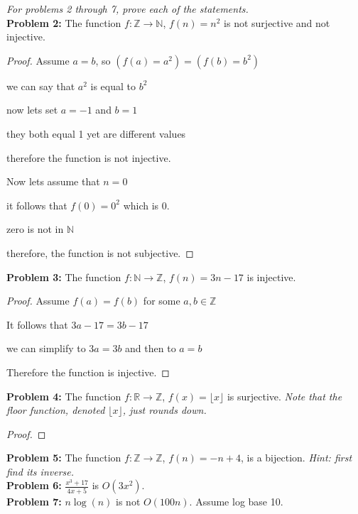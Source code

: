 \documentclass[12pt]{article}
\def\R{\mathbb R} %
\def\Z{\mathbb Z}
\def\N{\mathbb N}
\begin{document}
\textit{For problems 2 through 7, prove each of the statements.} \\ 

{\bf Problem 2:} The function $f:\Z \rightarrow \N$, $f(n)= n^2$ is not surjective and not injective.\\

\begin{proof}

    Assume $a=b$, so $(f(a)=a^2)=(f(b)=b^2)$

    we can say that $a^2$ is equal to $b^2$

    now lets set $a=-1$ and $b=1$

    they both equal 1 yet are different values

    therefore the function is not injective.

    Now lets assume that $n=0$

    it follows that $f(0)=0^2$ which is 0.

    zero is not in $\N$

    therefore, the function is not subjective.

\end{proof}

{\bf Problem 3:} The function $f:\N \rightarrow \Z$, $f(n)= 3n-17$ is injective.\\

\begin{proof}

    Assume $f(a)=f(b)$ for some $a,b\in\Z$

    It follows that $3a-17=3b-17$

    we can simplify to $3a=3b$ and then to $a=b$

    Therefore the function is injective.

\end{proof}

{\bf Problem 4:} The function $f:\R \rightarrow \Z$, $f(x)= \lfloor x \rfloor$ is surjective. \textit{Note that the floor function, denoted $\lfloor x \rfloor$, just rounds down. \\}

\begin{proof}

    

\end{proof}

{\bf Problem 5:} The function $f:\Z \rightarrow \Z$, $f(n)=-n + 4$, is a bijection. \textit{Hint: first find its inverse.} \\

{\bf Problem 6:} $\frac{x^3+17}{4x+5}$ is $O(3x^2)$. \\

{\bf Problem 7:} $n \log(n)$ is not $O(100 n)$. Assume log base 10.\\
\end{document}
